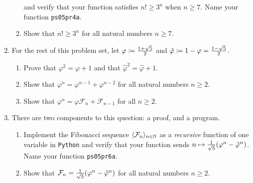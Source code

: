 \begin{enumerate}
\begin{enumerate}
                and verify that your function satisfies $n! \geq 3^n$ when $n \geq 7$.
                Name your function \texttt{ps05pr4a}.
            \item
                Show that $n! \geq 3^n$ for all natural numbers $n \geq 7$.
        \end{enumerate}
    \item
        For the rest of this problem set,
        let $\varphi \coloneqq \frac{1 + \sqrt{5}}{2}$
        and $\hat{\varphi} \coloneqq 1 - \varphi = \frac{1 - \sqrt{5}}{2}$.
        \begin{enumerate}
            \item
                Prove that $\varphi^2 = \varphi + 1$
                and that $\hat{\varphi}^2 = \hat{\varphi} + 1$.
            \item
                Show that $\varphi^n = \varphi^{n - 1} + \varphi^{n - 2}$
                for all natural numbers $n \geq 2$.
            \item
                Show that $\varphi^n = \varphi\mathcal{F}_{n} + \mathcal{F}_{n - 1}$
                for all $n \geq 2$.
        \end{enumerate}
    \item
        There are two components to this question: a proof, and a program.
        \begin{enumerate}
            \item
                Implement the Fibonacci sequence $\langle \mathcal{F}_n \rangle_{n \in \mathbb{N}}$
                as a \emph{recursive} function of one variable in \texttt{Python}
                and verify that your function sends
                $n \mapsto \frac{1}{\sqrt{5}}\pn*{\varphi^n - \hat{\varphi}^n}$.
                Name your function \texttt{ps05pr6a}.
            \item
                Show that
                $\mathcal{F}_n = \frac{1}{\sqrt{5}}\pn*{\varphi^n - \hat{\varphi}^n}$
                for all natural numbers $n \geq 2$.
        \end{enumerate}
\end{enumerate}

